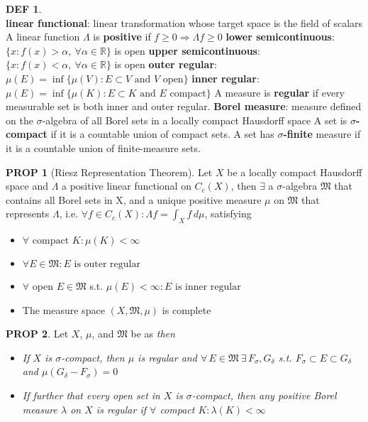 \documentclass[hidelinks,10pt]{article}
\theoremstyle{definition}
\newtheorem*{defin}{DEF}
\theoremstyle{dotles}
\theoremstyle{dotless}
\newtheorem{proposition}{PROP}[section]
\theoremstyle{remark}
\begin{document}
\begin{defin}~\\
\textbf{linear functional}: linear transformation whose target space is the field of scalars\newline
A linear function $\Lambda$ is \textbf{positive} if $f\geq0\Rightarrow\Lambda f\geq0$\bigbreak
\textbf{lower semicontinuous}: $\{x:f(x)>\alpha,\ \forall\alpha\in\mathbb{R}\}$ is open\newline
\textbf{upper semicontinuous}: $\{x:f(x)<\alpha,\ \forall\alpha\in\mathbb{R}\}$ is open\bigbreak
\textbf{outer regular}: $\mu(E)=\inf\{\mu(V):E\subset V\textrm{ and }V\textrm{ open}\}$\newline
\textbf{inner regular}: $\mu(E)=\inf\{\mu(K):E\subset K\textrm{ and }E\textrm{ compact}\}$\newline
A measure is \textbf{regular} if every measurable set is both inner and outer regular.\bigbreak
\textbf{Borel measure}: measure defined on the $\sigma$-algebra of all Borel sets in a locally compact Hausdorff space\bigbreak
A set is \textbf{$\sigma$-compact} if it is a countable union of compact sets.\newline
A set has \textbf{$\sigma$-finite} measure if it is a countable union of finite-measure sets.
\end{defin}

\begin{proposition}[Riesz Representation Theorem]\label{Prop 2.4}Let $X$ be a locally compact Hausdorff space and $\Lambda$ a positive linear functional on $C_c(X)$, then $\exists$ a $\sigma$-algebra $\mathfrak{M}$ that contains all Borel sets in X, and a unique positive measure $\mu$ on $\mathfrak{M}$ that represents $\Lambda$, i.e. $\forall f\in C_c(X):\Lambda  f=\int_Xf\,d\mu$, satisfying\begin{itemize}
    \item $\forall\textrm{ compact }K:\mu(K)<\infty$
    \item $\forall E\in\mathfrak{M}:E\textrm{ is outer regular}$
    \item $\forall$ open $E\in\mathfrak{M}$ s.t. $\mu(E)<\infty:E\textrm{ is inner regular}$
    \item The measure space $(X,\mathfrak{M},\mu)$ is complete
\end{itemize}
\end{proposition}

\begin{proposition}Let $X$, $\mu$, and $\mathfrak{M}$ be as \textit{ then}
\begin{itemize}
\item \textit{If $X$ is $\sigma$-compact, then $\mu$ is regular and $\forall\,E\in\mathfrak{M}\ \exists\,F_\sigma,G_\delta$ s.t. $F_\sigma\subset E\subset G_\delta$ and $\mu(G_\delta-F_\sigma)=0$}
\item \textit{If further that every open set in $X$ is $\sigma$-compact, then any positive Borel measure $\lambda$ on $X$ is regular if $\forall$ compact $K:\lambda(K)<\infty$}
\end{itemize}
\end{proposition}
\end{document}
